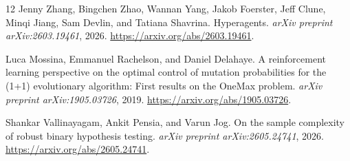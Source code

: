 \begin{thebibliography}{12}
Jenny Zhang, Bingchen Zhao, Wannan Yang, Jakob Foerster, Jeff Clune, Minqi Jiang, Sam Devlin, and Tatiana Shavrina.
Hyperagents.
\emph{arXiv preprint arXiv:2603.19461}, 2026.
\url{https://arxiv.org/abs/2603.19461}.

Luca Mossina, Emmanuel Rachelson, and Daniel Delahaye.
A reinforcement learning perspective on the optimal control of mutation probabilities for the (1+1) evolutionary algorithm: First results on the OneMax problem.
\emph{arXiv preprint arXiv:1905.03726}, 2019.
\url{https://arxiv.org/abs/1905.03726}.

Shankar Vallinayagam, Ankit Pensia, and Varun Jog.
On the sample complexity of robust binary hypothesis testing.
\emph{arXiv preprint arXiv:2605.24741}, 2026.
\url{https://arxiv.org/abs/2605.24741}.
\end{thebibliography}
